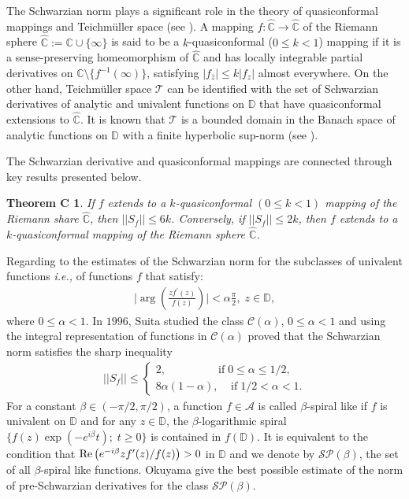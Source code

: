 \documentclass[a4paper,12pt]{amsart}
\theoremstyle{plain}
\theoremstyle{definition}
\theoremstyle{plain}
\newtheorem*{thmC}{Theorem C}
\newcounter {own}
\begin{document}
The Schwarzian norm plays a significant role in the theory of quasiconformal mappings and Teichm\"uller space (see \cite{Lehto-1987}). A mapping \( f : \hat{\mathbb{C}} \to \hat{\mathbb{C}} \) of the Riemann sphere \( \hat{\mathbb{C}} := \mathbb{C} \cup \{\infty\} \) is said to be a \( k \)-quasiconformal (\( 0 \leq k < 1 \)) mapping if it is a sense-preserving homeomorphism of \( \hat{\mathbb{C}} \) and has locally integrable partial derivatives on \( \mathbb{C} \setminus \{f^{-1}(\infty)\} \), satisfying \( |f_{\bar{z}}| \leq k |f_z| \) almost everywhere.  On the other hand, Teichm\"uller space \( \mathcal{T} \) can be identified with the set of Schwarzian derivatives of analytic and univalent functions on \( \mathbb{D} \) that have quasiconformal extensions to \( \hat{\mathbb{C}} \). It is known that \( \mathcal{T} \) is a bounded domain in the Banach space of analytic functions on \( \mathbb{D} \) with a finite hyperbolic sup-norm (see \cite{Lehto-1987}).  \vspace{2mm}

The Schwarzian derivative and quasiconformal mappings are connected through key results presented below.
\begin{thmC}\cite{Ahlfrors-Weill-PAMS-2012,Kühnau-MN-1971}
	If $f$ extends to a $k$-quasiconformal $(0\leq k<1)$ mapping of the Riemann share $\hat{\mathbb{C}}$, then $||S_f||\leq 6k$. Conversely, if $||S_f||\leq 2k$, then $f$ extends to a $k$-quasiconformal mapping of the Riemann sphere $\hat{\mathbb{C}}$.
\end{thmC}
Regarding to the estimates of the Schwarzian norm for the subclasses of univalent functions \emph{i.e.,} of functions $f$ that satisfy:
\begin{align*}
	\bigg|\arg\left(\frac{zf^{\prime}(z)}{f(z)}\right)\bigg|<\alpha\frac{\pi}{2},\; z\in\mathbb{D},
\end{align*}
where $0\leq \alpha<1$. In $1996$, Suita \cite{Suita-JHUED-1996} studied the class $\mathcal{C(\alpha)}$, $0\leq \alpha<1$ and using the integral representation of functions in $\mathcal{C}(\alpha)$ proved that the Schwarzian norm satisfies the sharp inequality 
\begin{align*}
	||S_f||\leq\begin{cases}
		2,\;\;\;\;\;\;\;\;\;\;\;\;\;\;\;\;\; \mbox{if}\; 0\leq \alpha\leq 1/2,\\
		8\alpha(1-\alpha),\;\;\;\;\mbox{if}\; 1/2<\alpha<1.
	\end{cases}
\end{align*}
For a constant $\beta\in (-\pi/2, \pi/2)$, a function $f\in\mathcal{A}$ is called $\beta$-spiral like if $f$ is univalent on $\mathbb{D}$ and for any $z\in\mathbb{D}$, the $\beta$-logarithmic spiral $\{f(z)\exp\left(-e^{i\beta}t\right);\; t\geq 0\}$ is contained in $f(\mathbb{D})$. It is equivalent to the condition that ${\rm Re} \left(e^{-i\beta}zf^{\prime}(z)/f(z)\right)>0$ in $\mathbb{D}$ and we denote by $\mathcal{SP}(\beta)$, the set of all $\beta$-spiral like functions. Okuyama \cite{Okuyama-CVTA-2000} give the best possible estimate of the norm of pre-Schwarzian derivatives for the class $\mathcal{SP}(\beta)$.\vspace{2mm}
\end{document}
